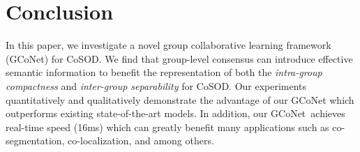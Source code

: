 \documentclass[final]{cvpr}
\def\ourmodel{GCoNet}
\begin{document}
\section{Conclusion}


In this paper, we investigate a novel group collaborative learning framework (\ourmodel) for CoSOD. We find that group-level consensus can introduce effective semantic information to benefit the representation of both the \textit{intra-group compactness} and \textit{inter-group separability} 
for CoSOD.  Our experiments quantitatively and qualitatively demonstrate the advantage of our  {\ourmodel} which outperforms existing state-of-the-art models. In addition, our {\ourmodel}~achieves real-time speed (16ms) which can greatly benefit many applications such as co-segmentation, co-localization, and among others.


{\small

}
\end{document}
